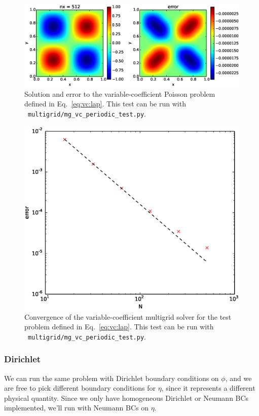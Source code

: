 \begin{figure}[t]
\centering
\includegraphics[width=\linewidth]{mg_vc_periodic_test}
\caption[Solution and error of a variable-coefficient Poisson problem]{\label{fig:mg_vc} Solution and error to the variable-coefficient 
Poisson problem defined in Eq.~\ref{eq:vc:lap}.  This test can be
run with \pyro\ {\tt multigrid/mg\_vc\_periodic\_test.py}.}
\end{figure}

\begin{figure}[t]
\centering
\includegraphics[width=0.8\linewidth]{mg_vc_converge}
\caption[Convergence of the variable-coefficient Poisson solver]{\label{fig:mg_vc_converge} Convergence of the variable-coefficient
multigrid solver for the test problem defined in Eq.~\ref{eq:vc:lap}.  This test can be
run with \pyro\ {\tt multigrid/mg\_vc\_periodic\_test.py}.}
\end{figure}

\subsubsection{Dirichlet}

We can run the same problem with Dirichlet boundary conditions on $\phi$,
and we are free to pick different boundary conditions for $\eta$, since
it represents a different physical quantity.  Since we only have homogeneous
Dirichlet or Neumann BCs implemented, we'll run with Neumann BCs on $\eta$.

